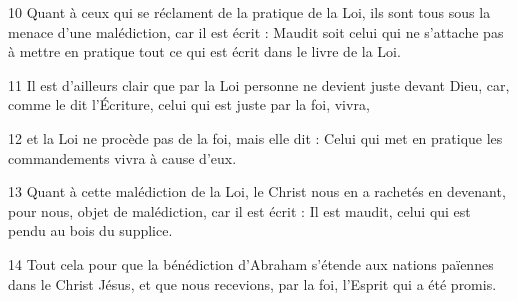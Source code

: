 10 Quant à ceux qui se réclament de la pratique de la Loi, ils sont tous sous la menace d’une malédiction, car il est écrit : Maudit soit celui qui ne s’attache pas à mettre en pratique tout ce qui est écrit dans le livre de la Loi.

11 Il est d’ailleurs clair que par la Loi personne ne devient juste devant Dieu, car, comme le dit l’Écriture, celui qui est juste par la foi, vivra,

12 et la Loi ne procède pas de la foi, mais elle dit : Celui qui met en pratique les commandements vivra à cause d’eux.

13 Quant à cette malédiction de la Loi, le Christ nous en a rachetés en devenant, pour nous, objet de malédiction, car il est écrit : Il est maudit, celui qui est pendu au bois du supplice.

14 Tout cela pour que la bénédiction d’Abraham s’étende aux nations païennes dans le Christ Jésus, et que nous recevions, par la foi, l’Esprit qui a été promis.
